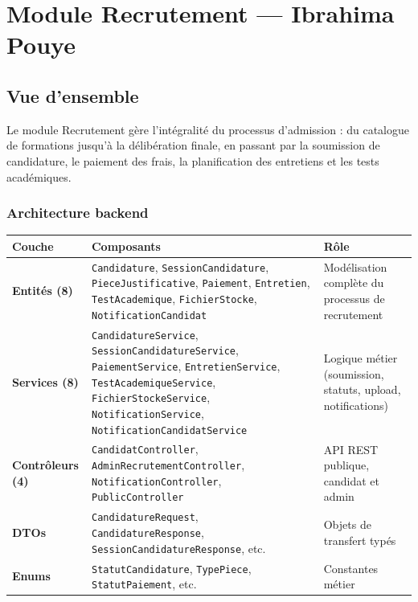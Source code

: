 \documentclass[a4paper,12pt,french]{article}
\begin{document}
\newpage

\section{Module Recrutement — Ibrahima Pouye}

\subsection{Vue d'ensemble}

Le module Recrutement gère l'intégralité du processus d'admission : du catalogue de formations jusqu'à la délibération finale, en passant par la soumission de candidature, le paiement des frais, la planification des entretiens et les tests académiques.

\subsubsection{Architecture backend}

\begin{center}
\begin{tabular}{|l|l|p{5cm}|}
\hline
\textbf{Couche} & \textbf{Composants} & \textbf{Rôle} \\
\hline
\addlinespace
\textbf{Entités (8)} & 
\texttt{Candidature},
\texttt{SessionCandidature},
\texttt{PieceJustificative},
\texttt{Paiement},
\texttt{Entretien},
\texttt{TestAcademique},
\texttt{FichierStocke},
\texttt{NotificationCandidat} &
Modélisation complète du processus de recrutement \\
\hline
\addlinespace
\textbf{Services (8)} &
\texttt{CandidatureService},
\texttt{SessionCandidatureService},
\texttt{PaiementService},
\texttt{EntretienService},
\texttt{TestAcademiqueService},
\texttt{FichierStockeService},
\texttt{NotificationService},
\texttt{NotificationCandidatService} &
Logique métier (soumission, statuts, upload, notifications) \\
\hline
\addlinespace
\textbf{Contrôleurs (4)} &
\texttt{CandidatController},
\texttt{AdminRecrutementController},
\texttt{NotificationController},
\texttt{PublicController} &
API REST publique, candidat et admin \\
\hline
\addlinespace
\textbf{DTOs} &
\texttt{CandidatureRequest},
\texttt{CandidatureResponse},
\texttt{SessionCandidatureResponse}, etc. &
Objets de transfert typés \\
\hline
\addlinespace
\textbf{Enums} &
\texttt{StatutCandidature},
\texttt{TypePiece},
\texttt{StatutPaiement}, etc. &
Constantes métier \\
\hline
\end{tabular}
\end{center}
\end{document}
